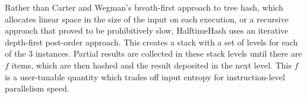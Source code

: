 \documentclass[runningheads]{llncs}
\begin{document}



Rather than Carter and Wegman's breath-first approach to tree hash, which allocates linear space in the size of the input on each execution, or a recursive approach that proved to be prohibitively slow, HalftimeHash uses an iterative depth-first post-order approach.
This creates a stack with a set of levels for each of the 3 instances.
Partial results are collected in these stack levels until there are $f$ items, which are then hashed and the result deposited in the next level.
This $f$ is a user-tunable quantity which trades off input entropy for instruction-level parallelism speed.


\end{document}
